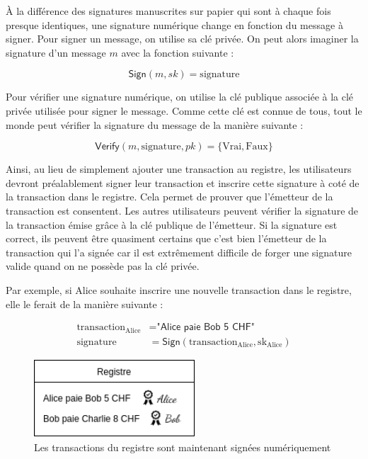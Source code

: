À la différence des signatures manuscrites sur papier qui sont à chaque fois presque identiques, une signature numérique change en fonction du message à signer. Pour signer un message, on utilise sa clé privée. On peut alors imaginer la signature d'un message $m$ avec la fonction suivante :

\begin{equation*}
  \mathsf{Sign}(m, sk) = \mathrm{signature}
\end{equation*}

Pour vérifier une signature numérique, on utilise la clé publique associée à la clé privée utilisée pour signer le message. Comme cette clé est connue de tous, tout le monde peut vérifier la signature du message de la manière suivante :

\begin{equation*}
  \mathsf{Verify}(m, \mathrm{signature}, pk) = \mathrm{\{Vrai, Faux\}}
\end{equation*}

Ainsi, au lieu de simplement ajouter une transaction au registre, les utilisateurs devront préalablement signer leur transaction et inscrire cette signature à coté de la transaction dans le registre. Cela permet de prouver que l'émetteur de la transaction est consentent. Les autres utilisateurs peuvent vérifier la signature de la transaction émise grâce à la clé publique de l'émetteur. Si la signature est correct, ils peuvent être quasiment certains que c'est bien l'émetteur de la transaction qui l'a signée car il est extrêmement difficile de forger une signature valide quand on ne possède pas la clé privée. 

Par exemple, si Alice souhaite inscrire une nouvelle transaction dans le registre, elle le ferait de la manière suivante :

\begin{align*}
  \mathrm{transaction_{Alice}} &= \textsf{"Alice paie Bob 5 CHF"}\\
  \mathrm{signature} &= \mathsf{Sign}(\mathrm{transaction_{Alice}, sk_{Alice}})
\end{align*}

\begin{figure}[H]
  \centering
  \includegraphics[width=6cm]{images/crypto_3.png}
  \caption{Les transactions du registre sont maintenant signées numériquement}
\end{figure}

